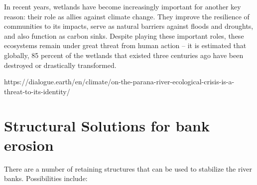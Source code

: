 In recent years, wetlands have become increasingly important for another key reason: their role as allies against climate change. They improve the resilience of communities to its impacts, serve as natural barriers against floods and droughts, and also function as carbon sinks. Despite playing these important roles, these ecosystems remain under great threat from human action – it is estimated that globally, 85 percent of the wetlands that existed three centuries ago have been destroyed or drastically transformed. 

https://dialogue.earth/en/climate/on-the-parana-river-ecological-crisis-is-a-threat-to-its-identity/


\newpage

\section{Structural Solutions for bank erosion}
There are a number of retaining structures that can be used to stabilize the river banks. Possibilities include:
